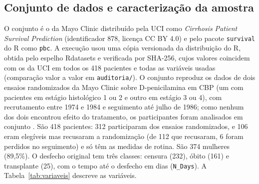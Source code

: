 \subsection{Conjunto de dados e caracterização da amostra}\label{subsec:dados}
O conjunto é o da Mayo Clinic distribuído pela UCI como \textit{Cirrhosis Patient Survival Prediction} (identificador 878, licença CC BY 4.0) \cite{uci878} e pelo pacote \texttt{survival} do R como \texttt{pbc}. A execução usou uma cópia versionada da distribuição do R, obtida pelo espelho Rdatasets e verificada por SHA-256, cujos valores coincidem com os da UCI em todos os 418 pacientes e todas as variáveis usadas (comparação valor a valor em \texttt{auditoria/}). O conjunto reproduz os dados de dois ensaios randomizados da Mayo Clinic sobre D-penicilamina em CBP (um com pacientes em estágio histológico 1 ou 2 e outro em estágio 3 ou 4), com recrutamento entre 1974 e 1984 e seguimento até julho de 1986; como nenhum dos dois encontrou efeito do tratamento, os participantes foram analisados em conjunto \cite{dickson1989prognosis,fleming1991counting}. São 418 pacientes: 312 participaram dos ensaios randomizados, e 106 eram elegíveis mas recusaram a randomização (de 112 que recusaram, 6 foram perdidos no seguimento) e só têm as medidas de rotina. São 374 mulheres (89,5\%). O desfecho original tem três classes: censura (232), óbito (161) e transplante (25), com o tempo até o desfecho em dias (\texttt{N\_Days}). A Tabela~\ref{tab:variaveis} descreve as variáveis.

